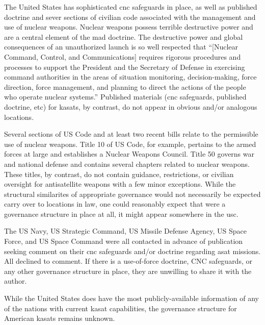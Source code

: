 The United States has sophisticated \ac{cnc} safeguards in place, as
well as published doctrine and sever sections of civilian code
associated with the management and use of nuclear weapons.\cite[the
  right joint publication]{xxx} Nuclear weapons possess terrible
destructive power and are a central element of the \ac{mad}
doctrine.\cite{getting-mad} The destructive power and global
consequences of an unauthorized launch is so well respected that
``[Nuclear Command, Control, and Communications] requires rigorous
procedures and processes to support the President and the Secretary of
Defense in exercising command authorities in the areas of situation
monitoring, decision-making, force direction, force management, and
planning to direct the actions of the people who operate nuclear
systems.''\cite{nuke-matters-handbook} Published materials (\ac{cnc}
safeguards, published doctrine, etc) for \acp{kasat}, by contrast, do
not appear in obvious and/or analogous locations.

Several sections of US Code and at least two recent
bills\cite[bill-1]{xxx}\cite[bill-2]{xxx} relate to the permissible
use of nuclear weapons.  Title 10 of US Code, for example, pertains to
the armed forces at large and establishes a Nuclear Weapons Council.
Title 50 governs war and national defense and contains several
chapters related to nuclear weapons.  These titles, by contrast, do
not contain guidance, restrictions, or civilian oversight for
antisatellite weapons with a few minor exceptions.  While the
structural similarites of appropriate governance would not necessarily
be expected carry over to locations in law, one could reasonably
expect that were a governance structure in place at all, it might
appear somewhere in the \acf{usc}.


The US Navy, US Strategic Command, US Missile Defense Agency, US Space
Force, and US Space Command were all contacted in advance of
publication seeking comment on their \ac{cnc} safeguards and/or
doctrine regarding \ac{asat} missions.  All declined to comment.  If
there is a use-of-force doctrine, CNC safeguards, or any other
governance structure in place, they are unwilling to share it with the
author.

While the United States does have the most publicly-available
information of any of the nations with current \ac{kasat}
capabilities, the governance structure for American \acp{kasat}
remains unknown.



